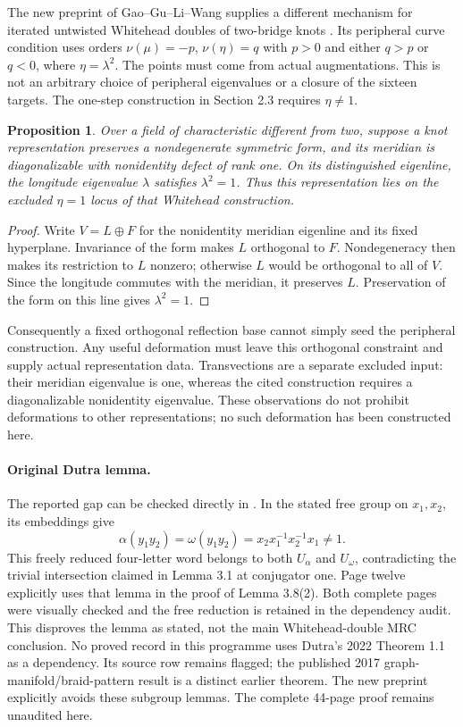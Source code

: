 \documentclass[11pt]{article}
\newtheorem{proposition}[theorem]{Proposition}
\begin{document}
The new preprint of Gao--Gu--Li--Wang supplies a different mechanism
for iterated untwisted Whitehead doubles of two-bridge knots
\cite{gglw}. Its peripheral curve condition uses orders
$\nu(\mu)=-p$, $\nu(\eta)=q$ with $p>0$ and either $q>p$ or $q<0$,
where $\eta=\lambda^2$. The points must come from actual
augmentations. This is not an arbitrary choice of peripheral
eigenvalues or a closure of the sixteen targets. The one-step
construction in Section 2.3 requires $\eta\ne1$.

\begin{proposition}\label{prop:orthogonal}
Over a field of characteristic different from two, suppose a knot
representation preserves a nondegenerate symmetric form, and its
meridian is diagonalizable with nonidentity defect of rank one.
On its distinguished eigenline, the longitude eigenvalue $\lambda$
satisfies $\lambda^2=1$. Thus this representation lies on the
excluded $\eta=1$ locus of that Whitehead construction.
\end{proposition}
\begin{proof}
Write $V=L\oplus F$ for the nonidentity meridian eigenline and its
fixed hyperplane. Invariance of the form makes $L$ orthogonal to
$F$. Nondegeneracy then makes its restriction to $L$ nonzero;
otherwise $L$ would be orthogonal to all of $V$. Since the longitude
commutes with the meridian, it preserves $L$. Preservation of the
form on this line gives $\lambda^2=1$.
\end{proof}

Consequently a fixed orthogonal reflection base cannot simply seed
the peripheral construction. Any useful deformation must leave this
orthogonal constraint and supply actual representation data.
Transvections are a separate excluded input: their meridian eigenvalue
is one, whereas the cited construction requires a diagonalizable
nonidentity eigenvalue. These observations do not prohibit
deformations to other representations; no such deformation has been
constructed here.

\paragraph{Original Dutra lemma.}
The reported gap can be checked directly in \cite[p.~7]{dutra}.
In the stated free group on $x_1,x_2$, its embeddings give
\[
 \alpha(y_1y_2)=\omega(y_1y_2)
   =x_2x_1^{-1}x_2^{-1}x_1\ne1.
\]
This freely reduced four-letter word belongs to both $U_\alpha$
and $U_\omega$, contradicting the trivial intersection claimed in
Lemma 3.1 at conjugator one. Page twelve explicitly uses that lemma
in the proof of Lemma 3.8(2). Both complete pages were visually
checked and the free reduction is retained in the dependency audit.
This disproves the lemma as stated, not the main Whitehead-double
MRC conclusion. No proved record in this programme uses Dutra's
2022 Theorem 1.1 as a dependency. Its source row remains flagged;
the published 2017 graph-manifold/braid-pattern result is a distinct
earlier theorem. The new preprint explicitly avoids these subgroup
lemmas. The complete 44-page proof remains unaudited here.
\end{document}
